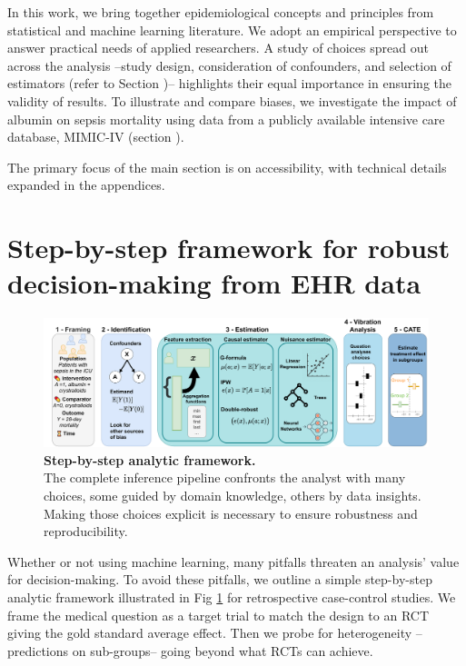 \documentclass[10pt,letterpaper]{article}
\begin{document}
In this work, we bring together epidemiological concepts and
principles from statistical and machine learning literature. We adopt
an empirical perspective to answer practical needs of applied researchers.
A study of choices spread out across the analysis
--study design, consideration of
confounders, and selection of estimators (refer to Section
)-- highlights their equal importance in ensuring
the validity of results. To illustrate and compare biases, we investigate
the impact of albumin on sepsis mortality using data from a publicly available
intensive care database, MIMIC-IV \cite{johnson2020mimic} (section
).

The primary focus of the main section is on accessibility, with technical
details expanded in the appendices.

%
\section*{Step-by-step framework for robust decision-making from EHR data}\label{sec:inference_flow}

\begin{figure}[t!]
  \centering
  \includegraphics[width=0.9\linewidth]{img_final/Fig1.pdf}
  \caption{\textbf{Step-by-step analytic framework.}\\The complete
    inference pipeline confronts the analyst with
    many choices, some guided by domain knowledge, others
    by data insights. Making those choices explicit is necessary to ensure
    robustness and reproducibility.}\label{fig:inference_framework}
\end{figure}



Whether or not using machine learning, many pitfalls threaten an analysis'
value for decision-making. To avoid these pitfalls, we outline a simple
step-by-step analytic framework illustrated in Fig
\ref{fig:inference_framework} for retrospective case-control studies. We frame
the medical question as a target trial \cite{hernan2021methods} to match the
design to an RCT giving the gold standard average effect. Then we probe for
heterogeneity --predictions on sub-groups--  going beyond what RCTs can
achieve.
\end{document}
